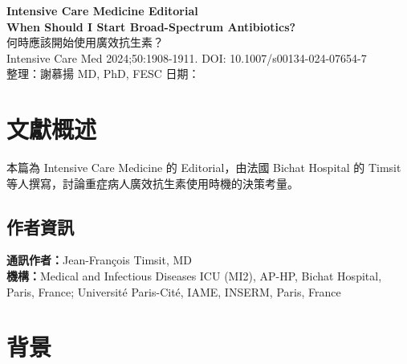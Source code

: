 \documentclass[12pt,a4paper]{article}
\begin{document}
\begin{center}
{\LARGE\bfseries\textcolor{emergency_red}{Intensive Care Medicine Editorial}}\\[0.5cm]
{\Large\textbf{When Should I Start Broad-Spectrum Antibiotics?}}\\[0.3cm]
{\large 何時應該開始使用廣效抗生素？}\\[0.5cm]
{\normalsize Intensive Care Med 2024;50:1908-1911. DOI: 10.1007/s00134-024-07654-7}\\[0.3cm]
{\normalsize 整理：謝慕揚 MD, PhD, FESC \quad 日期：\mydate}
\end{center}


\tableofcontents
\newpage

\section{文獻概述}

本篇為 Intensive Care Medicine 的 Editorial，由法國 Bichat Hospital 的 Timsit 等人撰寫，討論重症病人廣效抗生素使用時機的決策考量。

\subsection{作者資訊}
\textbf{通訊作者：}Jean-François Timsit, MD\\
\textbf{機構：}Medical and Infectious Diseases ICU (MI2), AP-HP, Bichat Hospital, Paris, France; Université Paris-Cité, IAME, INSERM, Paris, France

\section{背景}
\end{document}
